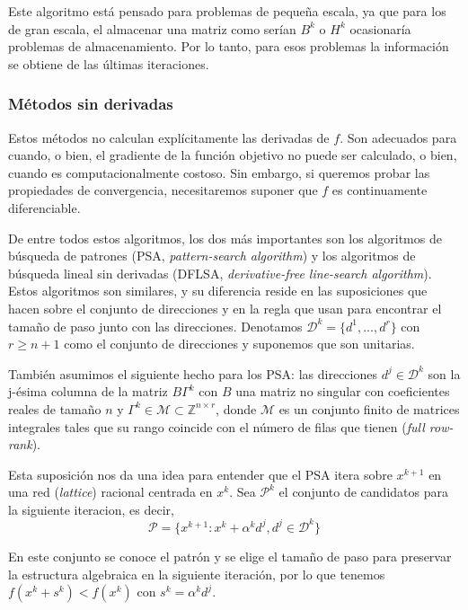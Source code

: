 Este algoritmo está pensado para problemas de pequeña escala, ya que para los de gran escala, el almacenar una matriz como serían $B^k$ o $H^k$ ocasionaría problemas de almacenamiento. 
Por lo tanto, para esos problemas la información se obtiene de las últimas iteraciones. 

\subsubsection{Métodos sin derivadas}

Estos métodos no calculan explícitamente las derivadas de $f$. 
Son adecuados para cuando, o bien, el gradiente de la función objetivo no puede ser calculado, o bien, cuando es computacionalmente costoso. 
Sin embargo, si queremos probar las propiedades de convergencia, necesitaremos suponer que $f$ es continuamente diferenciable. 

De entre todos estos algoritmos, los dos más importantes son los algoritmos de búsqueda de patrones (PSA, \textit{pattern-search algorithm}) y los algoritmos de búsqueda lineal sin derivadas (DFLSA, \textit{derivative-free line-search algorithm}). 
Estos algoritmos son similares, y su diferencia reside en las suposiciones que hacen sobre el conjunto de direcciones y en la regla que usan para encontrar el tamaño de paso junto con las direcciones. 
Denotamos $\mathcal{D}^k = \{d^1,...,d^r\}$ con $r\geq n+1$ como el conjunto de direcciones y suponemos que son unitarias. 

También asumimos el siguiente hecho para los PSA: las direcciones $d^j\in\mathcal{D}^k$ son la j-ésima columna de la matriz $B\Gamma^k$ con $B$ una matriz no singular con coeficientes reales de tamaño $n$ y $\Gamma^k\in\mathcal{M}\subset \mathbb{Z}^{n\times r}$, donde $\mathcal{M}$ es un conjunto finito	de matrices integrales tales que su rango coincide con el número de filas que tienen (\textit{full row-rank}).

Esta suposición nos da una idea para entender que el PSA itera sobre $x^{k+1}$ en una red (\textit{lattice}) racional centrada en $x^k$. 
Sea $\mathcal{P}^k$ el conjunto de candidatos para la siguiente iteracion, es decir, 
\begin{equation*}
\mathcal{P} = \{x^{k+1} : x^k + \alpha^kd^j, d^j\in\mathcal{D}^k\}
\end{equation*}

En este conjunto se conoce el patrón y se elige el tamaño de paso para preservar la estructura algebraica en la siguiente iteración, por lo que tenemos $f(x^k+s^k) < f(x^k)$ con $s^k = \alpha^k d^j$.

